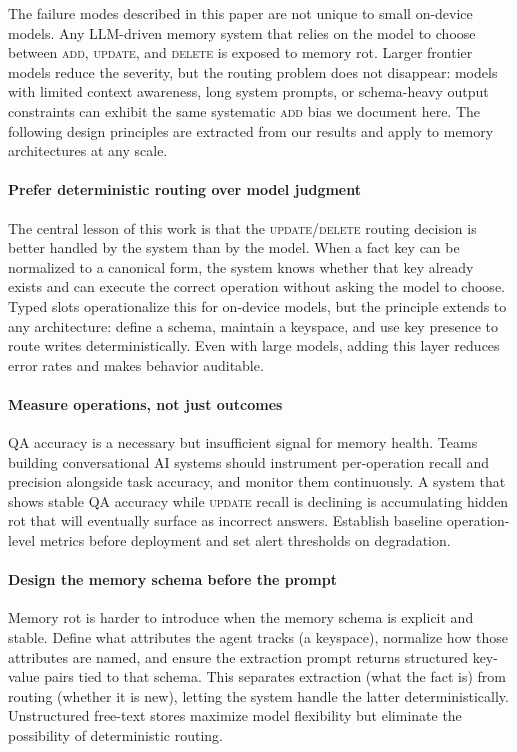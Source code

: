 \documentclass[10pt, twocolumn]{article}
\begin{document}
The failure modes described in this paper are not unique to small on-device
models. Any LLM-driven memory system that relies on the model to choose
between \textsc{add}, \textsc{update}, and \textsc{delete} is exposed to
memory rot. Larger frontier models reduce the severity, but the routing
problem does not disappear: models with limited context awareness, long
system prompts, or schema-heavy output constraints can exhibit the same
systematic \textsc{add} bias we document here.
The following design principles are extracted from our results and apply
to memory architectures at any scale.

\paragraph{Prefer deterministic routing over model judgment}
The central lesson of this work is that the \textsc{update}/\textsc{delete}
routing decision is better handled by the system than by the model.
When a fact key can be normalized to a canonical form, the system knows
whether that key already exists and can execute the correct operation
without asking the model to choose.
Typed slots operationalize this for on-device models, but the principle
extends to any architecture: define a schema, maintain a keyspace, and
use key presence to route writes deterministically.
Even with large models, adding this layer reduces error rates and makes
behavior auditable.

\paragraph{Measure operations, not just outcomes}
QA accuracy is a necessary but insufficient signal for memory health.
Teams building conversational AI systems should instrument per-operation
recall and precision alongside task accuracy, and monitor them continuously.
A system that shows stable QA accuracy while \textsc{update} recall
is declining is accumulating hidden rot that will eventually surface as
incorrect answers. Establish baseline operation-level metrics before
deployment and set alert thresholds on degradation.

\paragraph{Design the memory schema before the prompt}
Memory rot is harder to introduce when the memory schema is explicit and
stable. Define what attributes the agent tracks (a keyspace), normalize
how those attributes are named, and ensure the extraction prompt returns
structured key-value pairs tied to that schema. This separates extraction
(what the fact is) from routing (whether it is new), letting the system
handle the latter deterministically. Unstructured free-text stores
maximize model flexibility but eliminate the possibility of deterministic
routing.
\end{document}
